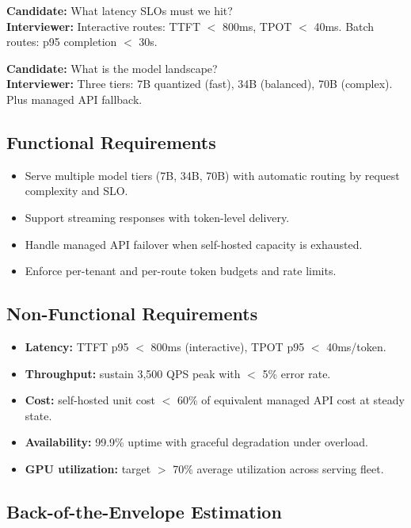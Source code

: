 \textbf{Candidate:} What latency SLOs must we hit?\\
\textbf{Interviewer:} Interactive routes: TTFT $<$ 800ms, TPOT $<$ 40ms. Batch routes: p95 completion $<$ 30s.

\textbf{Candidate:} What is the model landscape?\\
\textbf{Interviewer:} Three tiers: 7B quantized (fast), 34B (balanced), 70B (complex). Plus managed API fallback.

\subsection*{Functional Requirements}

\begin{itemize}
  \item Serve multiple model tiers (7B, 34B, 70B) with automatic routing by request complexity and SLO.
  \item Support streaming responses with token-level delivery.
  \item Handle managed API failover when self-hosted capacity is exhausted.
  \item Enforce per-tenant and per-route token budgets and rate limits.
\end{itemize}

\subsection*{Non-Functional Requirements}

\begin{itemize}
  \item \textbf{Latency:} TTFT p95 $<$ 800ms (interactive), TPOT p95 $<$ 40ms/token.
  \item \textbf{Throughput:} sustain 3,500 QPS peak with $<$ 5\% error rate.
  \item \textbf{Cost:} self-hosted unit cost $<$ 60\% of equivalent managed API cost at steady state.
  \item \textbf{Availability:} 99.9\% uptime with graceful degradation under overload.
  \item \textbf{GPU utilization:} target $>$ 70\% average utilization across serving fleet.
\end{itemize}

\subsection*{Back-of-the-Envelope Estimation}

